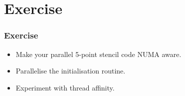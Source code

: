 \documentclass{beamer}
\begin{document}
\section{Exercise}
\begin{frame}
\frametitle{Exercise}
\begin{itemize}
  \item Make your parallel 5-point stencil code NUMA aware.
  \item Parallelise the initialisation routine.
  \item Experiment with thread affinity.
\end{itemize}
\end{frame}

\end{document}
